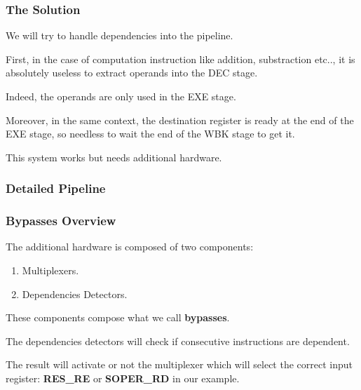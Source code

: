 \begin{frame}
  \frametitle{The Solution}

  We will try to handle dependencies into the pipeline.

  \nl

  First, in the case of computation instruction like addition, substraction
  etc.., it is absolutely useless to extract operands into the DEC stage.

  \nl

  Indeed, the operands are only used in the EXE stage.

  \nl

  Moreover, in the same context, the destination register is ready
  at the end of the EXE stage, so needless to wait the end of the
  WBK stage to get it.

  \begin{center}
  \end{center}

  This system works but needs additional hardware.
\end{frame}


\begin{frame}
  \frametitle{Detailed Pipeline}

  \begin{center}
  \end{center}
\end{frame}


\begin{frame}
  \frametitle{Bypasses Overview}

  The additional hardware is composed of two components:

  \begin{enumerate}[<+->]
    \item
      Multiplexers.
    \item
      Dependencies Detectors.
  \end{enumerate}

  \nl

  These components compose what we call \textbf{bypasses}.

  \nl

  The dependencies detectors will check if consecutive instructions
  are dependent.

  \nl

  The result will activate or not the multiplexer which will select
  the correct input register: \textbf{RES\_RE} or \textbf{SOPER\_RD}
  in our example.
\end{frame}

